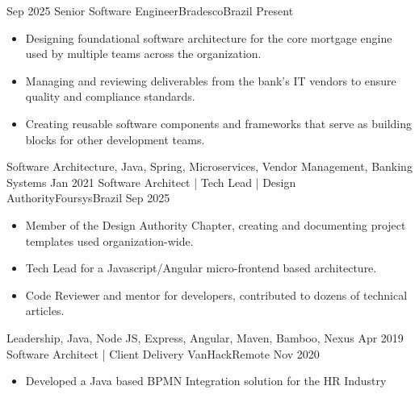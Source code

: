 %
%
%
\begin{experiences}
  \experience
    {Sep 2025}   {Senior Software Engineer}{Bradesco}{Brazil}
    {Present} {
                      \begin{itemize}
                        \item Designing foundational software architecture for the core mortgage engine used by multiple teams across the organization.
                        \item Managing and reviewing deliverables from the bank's IT vendors to ensure quality and compliance standards.
                        \item Creating reusable software components and frameworks that serve as building blocks for other development teams.                          
                      \end{itemize}
                    }
                    {Software Architecture, Java, Spring, Microservices, Vendor Management, Banking Systems}
  \emptySeparator
  \experience
    {Jan 2021}   {Software Architect | Tech Lead | Design Authority}{Foursys}{Brazil}
    {Sep 2025} {
                      \begin{itemize}
                        \item Member of the Design Authority Chapter, creating and documenting project templates used organization-wide.
                        \item Tech Lead for a Javascript/Angular micro-frontend based architecture.
                        \item Code Reviewer and mentor for developers, contributed to dozens of technical articles.                          
                      \end{itemize}
                    }
                    {Leadership, Java, Node JS, Express, Angular, Maven, Bamboo, Nexus}
  \emptySeparator
  \experience
    {Apr 2019} {Software Architect | Client Delivery }{VanHack}{Remote}
    {Nov 2020}    {
                      \begin{itemize}
                        \item Developed a Java based BPMN Integration solution for the HR Industry         

\end{itemize}}
\end{experiences}
